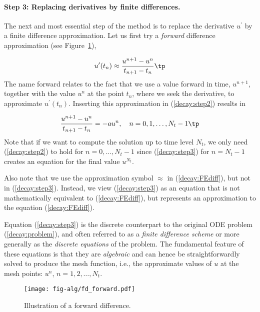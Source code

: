 \documentclass[graybox,sectrefs,envcountresetchap,open=right,final]{svmonodo}
\begin{document}

\paragraph{Step 3: Replacing derivatives by finite differences.}
The next and most essential step of the method is to replace the
derivative $u^{\prime}$ by a finite difference approximation. Let us first
try a \emph{forward} difference approximation (see Figure~\ref{decay:sketch:FE}),

 

\begin{equation}
u^{\prime}(t_n) \approx \frac{u^{n+1}-u^{n}}{t_{n+1}-t_n}\tp
\label{decay:FEdiff}
\end{equation}
The name forward relates to the fact that we use a value forward in
time, $u^{n+1}$, together with the value $u^n$ at the point $t_n$, where
we seek the derivative, to approximate $u^{\prime}(t_n)$.
Inserting this approximation in (\ref{decay:step2}) results in

\begin{equation}
\frac{u^{n+1}-u^{n}}{t_{n+1}-t_n} = -au^{n},\quad n=0,1,\ldots,N_t-1\tp
\label{decay:step3}
\end{equation}
Note that if we want to compute the solution
up to time level $N_t$,
we only need (\ref{decay:step2}) to hold for $n=0,\ldots,N_t-1$ since
(\ref{decay:step3}) for $n=N_t-1$ creates an equation for the final
value $u^{N_t}$.

Also note that we use the approximation symbol $\approx$ in (\ref{decay:FEdiff}),
but not in (\ref{decay:step3}). Instead, we view (\ref{decay:step3}) as
an equation that is not mathematically equivalent to (\ref{decay:FEdiff}),
but represents an approximation to the equation (\ref{decay:FEdiff}).

Equation (\ref{decay:step3})
is the discrete counterpart to the original ODE problem
(\ref{decay:problem}), and often referred to as a \emph{finite difference scheme}
or more generally as the \emph{discrete equations} of the problem.
The fundamental feature of these equations is that they are \emph{algebraic}
and can hence be straightforwardly solved to produce the mesh function, i.e.,
the approximate values of $u$ at
the mesh points: $u^n$, $n=1,2,\ldots,N_t$.


\begin{figure}[!ht]  %
  \centerline{\texttt{[image: fig-alg/fd\_forward.pdf]}}
  \caption{
  Illustration of a forward difference. \label{decay:sketch:FE}
  }
\end{figure}
\end{document}
